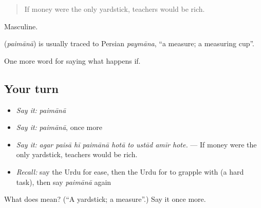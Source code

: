 \begin{quote}
If money were the only yardstick, teachers would be rich.
\end{quote}

Masculine.

\begin{cousinweb}
\textbf{} (\emph{paimānā}) is usually traced to Persian \emph{paymāna}, \textquotedblleft{}a measure; a measuring cup\textquotedblright{}.
\end{cousinweb}

\begin{grammarlens}[title={What you've built}]
One more word for saying what happens if.
\end{grammarlens}

\subsection*{Your turn}
\begin{itemize}
\raggedright
  \item \emph{Say it:} \emph{paimānā}
  \item \emph{Say it:} \emph{paimānā}, once more
  \item \emph{Say it:} \emph{agar paisā hī paimānā hotā to ustād amīr hote.} — If money were the only yardstick, teachers would be rich.
  \item \emph{Recall:} say the Urdu for ease, then the Urdu for to grapple with (a hard task), then say \emph{paimānā} again
\end{itemize}

\begin{tcolorbox}[breakable,colback=teal!4,colframe=teal!35!black,title={Before you move on}]
What does  mean? (\textquotedblleft{}A yardstick; a measure\textquotedblright{}.) Say it once more.
\end{tcolorbox}
